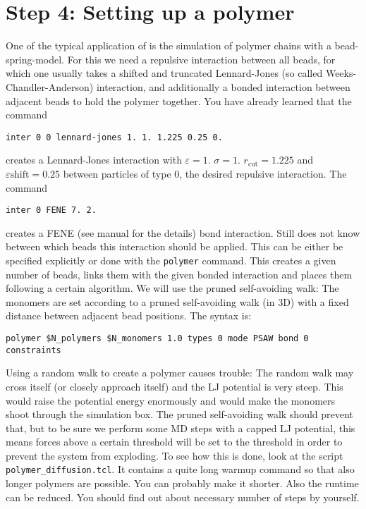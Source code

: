 \section{Step 4: Setting up a polymer}
One of the typical application of \ES{} is the simulation of polymer chains 
with a bead-spring-model. For this we need a repulsive interaction
between all beads, for which one usually takes a shifted and truncated
Lennard-Jones (so called Weeks-Chandler-Anderson) interaction, 
and additionally a bonded interaction between 
adjacent beads to hold the polymer together. You have already learned
that the command
{\vspace{0,2cm}\small
\begin{lstlisting}[numbers=none]
inter 0 0 lennard-jones 1. 1. 1.225 0.25 0. 
\end{lstlisting}\vspace{0,2cm}
}
creates a Lennard-Jones interaction with $\varepsilon=1.$ $\sigma=1.$
$r_\text{cut} = 1.225$ and $\varepsilon\text{shift}=0.25$ between particles
of type 0, the desired 
repulsive interaction. The command
{\vspace{0,2cm}\small
\begin{lstlisting}[numbers=none]
inter 0 FENE 7. 2. 
\end{lstlisting}\vspace{0,2cm}
}
creates a FENE (see \ES{} manual for the details) bond interaction. Still \ES{}
does not know between which beads this interaction should be applied.
This can be either be specified explicitly or done with the \lstinline|polymer|
command. This creates a given number of beads, links them with the given
bonded interaction and places them following a certain algorithm. We will
use the pruned self-avoiding walk: The monomers are set according 
to a pruned self-avoiding walk (in 3D) with a
fixed distance between adjacent bead positions. The syntax is:
{\vspace{0,2cm}\small
\begin{lstlisting}[numbers=none]
  polymer $N_polymers $N_monomers 1.0 types 0 mode PSAW bond 0 constraints 
\end{lstlisting}\vspace{0,2cm}
}
Using a random walk to create a polymer causes trouble: The random walk may 
cross itself (or closely approach itself) and the LJ potential is very
steep. This would raise the potential energy enormously and would make
the monomers shoot through the simulation box. The pruned self-avoiding
walk should prevent that, but to be sure
we perform some MD steps with a capped LJ potential, this means 
forces above a certain threshold will be set to the threshold in order to prevent
the system from exploding. To see how this is done, look at the script 
\lstinline|polymer_diffusion.tcl|.
It contains a quite long warmup command so that also longer polymers
are possible. You can probably make it shorter. Also the runtime
can be reduced. You should find out about necessary number of steps
by yourself.

